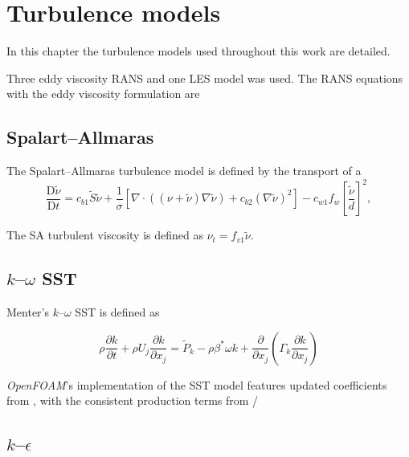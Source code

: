\chapter{Turbulence models}
\doublespace

In this chapter the turbulence models used throughout this work are detailed.

Three eddy viscosity RANS and one LES model was used. The RANS equations with
the eddy viscosity formulation are



\section{Spalart--Allmaras}

The Spalart--Allmaras turbulence model is defined by the transport of a
\begin{equation}
    \frac{\mathrm{D} \tilde{\nu}}{\mathrm{D} t}
    = c_{b1} \tilde{S} \tilde{\nu}
    + \frac{1}{\sigma}
    \left[
    \nabla \cdot \left( (\nu + \tilde{\nu}) \nabla \tilde{\nu} \right)
    + c_{b2} (\nabla \tilde{\nu})^2
    \right]
    - c_{w1} f_w \left[ \frac{\tilde{\nu}}{d} \right]^2,
    \label{eq:SA}
\end{equation}

The SA turbulent viscosity is defined as $\nu_t = f_{v1} \tilde{\nu}$.


\section{$k$--$\omega$ SST}

Menter's $k$--$\omega$ SST is defined as \cite{Menter2001}

\begin{equation}
    \rho \frac{\partial k}{\partial t}
    + \rho U_j \frac{\partial k}{\partial x_j}
    = \tilde{P}_k - \rho \beta^* \omega k
    + \frac{\partial}{\partial x_j}
    \left(
    \Gamma_k \frac{\partial k}{\partial x_j}
    \right)
    \label{eq:komegasst-k}
\end{equation}

\textit{OpenFOAM}'s implementation of the SST model features updated
coefficients from \cite{Menter2003}, with the consistent production terms from
\cite{Menter2001}/


\section{$k$--$\epsilon$}

